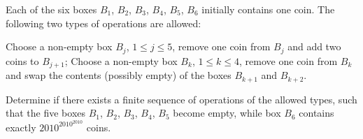 Each of the six boxes $B_1$, $B_2$, $B_3$, $B_4$, $B_5$, $B_6$
initially contains one coin.
The following two types of operations are allowed:
\begin{enumerate}
  \ii Choose a non-empty box $B_j$, $1\leq j \leq 5$,
  remove one coin from $B_j$ and add two coins to $B_{j+1}$;
  \ii Choose a non-empty box $B_k$, $1\leq k \leq 4$,
  remove one coin from $B_k$ and swap the contents
  (possibly empty) of the boxes $B_{k+1}$ and $B_{k+2}$.
\end{enumerate}
Determine if there exists a finite sequence of operations of the allowed types,
such that the five boxes $B_1$, $B_2$, $B_3$, $B_4$, $B_5$ become empty,
while box $B_6$ contains exactly $2010^{2010^{2010}}$ coins.